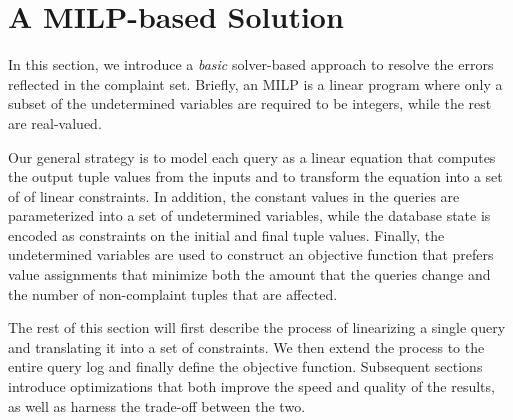 
\section{A MILP-based Solution}
\label{sec:sol}

In this section, we introduce a \emph{basic} solver-based approach to 
resolve the errors reflected in the complaint set. 
Briefly, an MILP is a linear program where only a subset of the undetermined variables
are required to be integers, while the rest are real-valued.

Our general strategy is to model each query as a linear equation 
that computes the output tuple values from the inputs and to transform the
equation into a set of of linear constraints.   
In addition, the constant values in the queries are parameterized
into a set of undetermined variables, while the database state is encoded 
as constraints on the initial and final tuple values.
Finally, the undetermined variables are used to construct an objective function
that prefers value assignments that minimize both the amount that the queries change and
the number of non-complaint tuples that are affected. 

The rest of this section will first describe the process of linearizing a single query
and translating it into a set of constraints.  We then extend the process to the entire
query log and finally define the objective function.
Subsequent sections introduce optimizations that both
improve the speed and quality of the results, as well as harness the trade-off between the two. 
